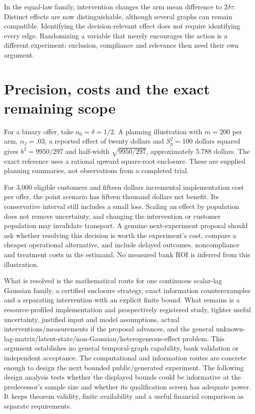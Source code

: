 In the equal-law family, intervention changes the arm mean difference to
\(2\delta\tau\). Distinct effects are now distinguishable, although
several graphs can remain compatible. Identifying the decision-relevant
effect does not require identifying every edge. Randomizing a variable
that merely encourages the action is a different experiment: exclusion,
compliance and relevance then need their own argument.

\hypertarget{precision-costs-and-the-exact-remaining-scope}{%
\section{Precision, costs and the exact remaining
scope}\label{precision-costs-and-the-exact-remaining-scope}}

For a binary offer, take \(a_0=\delta=1/2\). A planning illustration
with \(m=200\) per arm, \(\alpha_I=.03\), a reported effect of twenty
dollars and \(S_p^2=100\) dollars squared gives \(b^2=9950/297\) and
half-width \(\sqrt{9950/297}\), approximately 5.788 dollars. The exact
reference uses a rational upward square-root enclosure. These are
supplied planning summaries, not observations from a completed trial.

For 3,000 eligible customers and fifteen dollars incremental
implementation cost per offer, the point scenario has fifteen thousand
dollars net benefit. Its conservative interval still includes a small
loss. Scaling an effect by population does not remove uncertainty, and
changing the intervention or customer population may invalidate
transport. A genuine next-experiment proposal should ask whether
resolving this decision is worth the experiment's cost, compare a
cheaper operational alternative, and include delayed outcomes,
noncompliance and treatment costs in the estimand. No measured bank ROI
is inferred from this illustration.

What is resolved is the mathematical route for one continuous scalar-lag
Gaussian family, a certified enclosure strategy, exact information
counterexamples and a separating intervention with an explicit finite
bound. What remains is a resource-profiled implementation and
prospectively registered study, tighter useful uncertainty, justified
input and model assumptions, actual interventions/measurements if the
proposal advances, and the general
unknown-lag-matrix/latent-state/non-Gaussian/heterogeneous-effect
problem. This argument establishes no general temporal-graph capability,
bank validation or independent acceptance. The computational and
information routes are concrete enough to design the next bounded
public/generated experiment. The following design analysis tests whether the displayed bounds could be informative at the predecessor's sample size and whether its qualification screen has adequate power. It keeps theorem validity, finite availability and a useful financial comparison as separate requirements.

